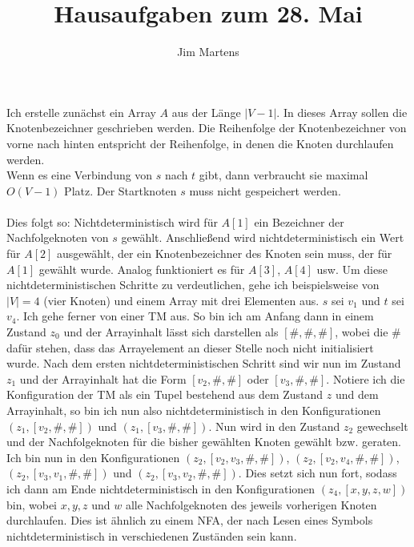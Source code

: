 \documentclass[10pt,a4paper,oneside,ngerman,numbers=noenddot]{scrartcl}
\begin{document}
\author{Jim Martens}
\title{Hausaufgaben zum 28. Mai}
\maketitle

\section{} %
\subsection{} %
Ich erstelle zunächst ein Array $A$ aus der Länge $|V-1|$. In dieses Array sollen die Knotenbezeichner geschrieben werden. Die Reihenfolge der Knotenbezeichner von vorne nach hinten entspricht der Reihenfolge, in denen die Knoten durchlaufen werden. \\
Wenn es eine Verbindung von $s$ nach $t$ gibt, dann verbraucht sie maximal $O(V-1)$ Platz. Der Startknoten $s$ muss nicht gespeichert werden.\\
\\
Dies folgt so: Nichtdeterministisch wird für $A[1]$ ein Bezeichner der Nachfolgeknoten von $s$ gewählt. Anschließend wird nichtdeterministisch ein Wert für $A[2]$ ausgewählt, der ein Knotenbezeichner des Knoten sein muss, der für $A[1]$ gewählt wurde. Analog funktioniert es für $A[3]$, $A[4]$ usw. Um diese nichtdeterministischen Schritte zu verdeutlichen, gehe ich beispielsweise von $|V|=4$ (vier Knoten) und einem Array mit drei Elementen aus. $s$ sei $v_{1}$ und $t$ sei $v_{4}$. Ich gehe ferner von einer TM aus. So bin ich am Anfang dann in einem Zustand $z_{0}$ und der Arrayinhalt lässt sich darstellen als $[\#,\#,\#]$, wobei die $\#$ dafür stehen, dass das Arrayelement an dieser Stelle noch nicht initialisiert wurde.  Nach dem ersten nichtdeterministischen Schritt sind wir nun im Zustand $z_{1}$ und der Arrayinhalt hat die Form $[v_{2},\#,\#]$ oder $[v_{3},\#,\#]$. Notiere ich die Konfiguration der TM als ein Tupel bestehend aus dem Zustand $z$ und dem Arrayinhalt, so bin ich nun also nichtdeterministisch in den Konfigurationen $(z_{1},[v_{2},\#,\#])$ und $(z_{1},[v_{3},\#,\#])$. Nun wird in den Zustand $z_{2}$ gewechselt und der Nachfolgeknoten für die bisher gewählten Knoten gewählt bzw. geraten. Ich bin nun in den Konfigurationen $(z_{2},[v_{2},v_{3},\#,\#])$, $(z_{2},[v_{2},v_{4},\#,\#])$, $(z_{2},[v_{3},v_{1},\#,\#])$ und $(z_{2},[v_{3},v_{2},\#,\#])$. Dies setzt sich nun fort, sodass ich dann am Ende nichtdeterministisch in den Konfigurationen $(z_{4},[x,y,z,w])$ bin, wobei $x,y,z$ und $w$ alle Nachfolgeknoten des jeweils vorherigen Knoten durchlaufen. Dies ist ähnlich zu einem NFA, der nach Lesen eines Symbols nichtdeterministisch in verschiedenen Zuständen sein kann.\\
\end{document}
